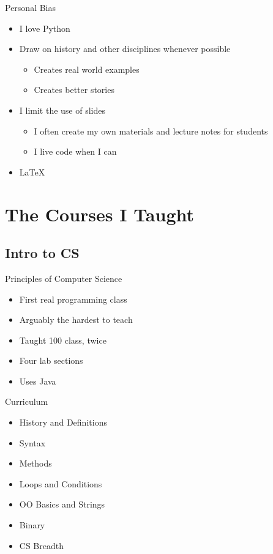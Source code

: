\documentclass[11pt]{beamer}
\begin{document}
\begin{frame}{Personal Bias}
	\begin{itemize}
		\item I love Python
		\pause
		\item Draw on history and other disciplines whenever possible
		\pause 
		\begin{itemize}
			\item Creates real world examples
			\item Creates better stories
		\end{itemize}
		\pause
		\item I limit the use of slides
		\begin{itemize}
			\item I often create my own materials and lecture notes for students
			\item I live code when I can
		\end{itemize}
		\pause
		\item \LaTeX
	\end{itemize}
\end{frame}

\section{The Courses I Taught}

\subsection{Intro to CS}
\begin{frame}{Principles of Computer Science}
	\begin{itemize}
		\item First real programming class
		\item Arguably the hardest to teach
		\item Taught 100 class, twice 
		\item Four lab sections
		\item Uses Java
	\end{itemize}
\end{frame}



\begin{frame}{Curriculum}
	\begin{itemize}
		\item History and Definitions
		\item Syntax
		\item Methods
		\item Loops and Conditions
		\item OO Basics and Strings
		\item Binary
		\item CS Breadth
	\end{itemize}
\end{frame}
\end{document}
